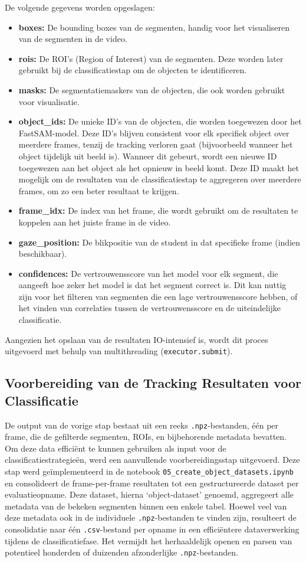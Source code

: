 De volgende gegevens worden opgeslagen:
\begin{itemize}
    \item \textbf{boxes:} De bounding boxes van de segmenten, handig voor het visualiseren van de segmenten in de video.
    \item \textbf{rois:} De ROI's (Region of Interest) van de segmenten. Deze worden later gebruikt bij de classificatiestap om de objecten te identificeren.
    \item \textbf{masks:} De segmentatiemaskers van de objecten, die ook worden gebruikt voor visualisatie.
    \item \textbf{object\_ids:} De unieke ID's van de objecten, die worden toegewezen door het FastSAM-model. Deze ID's blijven consistent voor elk specifiek object over meerdere frames,
    tenzij de tracking verloren gaat (bijvoorbeeld wanneer het object tijdelijk uit beeld is). Wanneer dit gebeurt, wordt een nieuwe ID toegewezen aan het object als het opnieuw in beeld komt.
    Deze ID maakt het mogelijk om de resultaten van de classificatiestap te aggregeren over meerdere frames, om zo een beter resultaat te krijgen.
    \item \textbf{frame\_idx:} De index van het frame, die wordt gebruikt om de resultaten te koppelen aan het juiste frame in de video.
    \item \textbf{gaze\_position:} De blikpositie van de student in dat specifieke frame (indien beschikbaar).
    \item \textbf{confidences:} De vertrouwensscore van het model voor elk segment, die aangeeft hoe zeker het model is dat het segment correct is.
    Dit kan nuttig zijn voor het filteren van segmenten die een lage vertrouwensscore hebben, 
    of het vinden van correlaties tussen de vertrouwensscore en de uiteindelijke classificatie.
\end{itemize}
Aangezien het opslaan van de resultaten IO-intensief is, wordt dit proces uitgevoerd met behulp van multithreading (\texttt{executor.submit}).

\subsection{Voorbereiding van de Tracking Resultaten voor Classificatie}

De output van de vorige stap bestaat uit een reeks \texttt{.npz}-bestanden, één per frame, 
die de gefilterde segmenten, ROIs, en bijbehorende metadata bevatten. 
Om deze data efficiënt te kunnen gebruiken als input voor de classificatiestrategieën, werd een aanvullende voorbereidingsstap uitgevoerd. 
Deze stap werd geïmplementeerd in de notebook \texttt{05\_create\_object\_datasets.ipynb} en consolideert de frame-per-frame 
resultaten tot een gestructureerde dataset per evaluatieopname. 
Deze dataset, hierna `object-dataset' genoemd, aggregeert alle metadata van de bekeken segmenten binnen een enkele tabel.
Hoewel veel van deze metadata ook in de individuele \texttt{.npz}-bestanden te vinden zijn, resulteert de consolidatie 
naar één \texttt{.csv}-bestand per opname in een efficiëntere dataverwerking tijdens de classificatiefase. 
Het vermijdt het herhaaldelijk openen en parsen van potentieel honderden of duizenden afzonderlijke \texttt{.npz}-bestanden.

